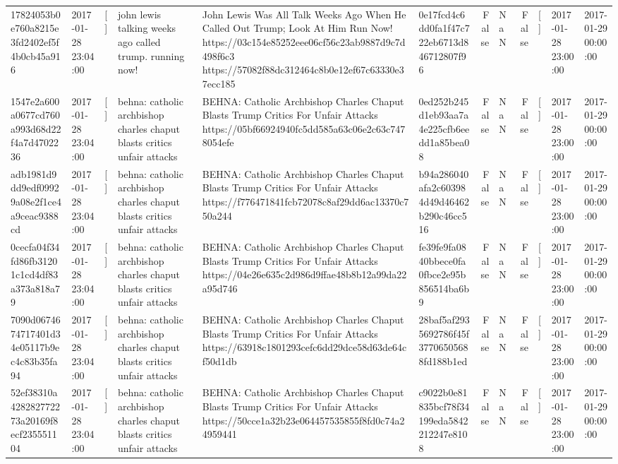 \begin{tabular}{llllllrlrlll}
17824053b0e760a8215e3fd2402ef5f4b0cb45a916 & 2017-01-28 23:04:00 & [] & john lewis talking weeks ago called trump. running now! & John Lewis Was All Talk Weeks Ago When He Called Out Trump; Look At Him Run Now! https://03c154e85252eee06cf56c23ab9887d9c7d498f6c3 https://57082f88dc312464c8b0e12ef67c63330e37ecc185 & 0e17fcd4c6dd0fa1f47c722eb6713d846712807f96 & False & NaN & False & [] & 2017-01-28 23:00:00 & 2017-01-29 00:00:00 \\
1547e2a600a0677cd760a993d68d22f4a7d4702236 & 2017-01-28 23:04:00 & [] & behna: catholic archbishop charles chaput blasts critics unfair attacks & BEHNA: Catholic Archbishop Charles Chaput Blasts Trump Critics For Unfair Attacks https://05bf66924940fc5dd585a63c06e2c63c7478054efe & 0ed252b245d1eb93aa7a4e225cfb6eedd1a85bea08 & False & NaN & False & [] & 2017-01-28 23:00:00 & 2017-01-29 00:00:00 \\
adb1981d9dd9edf09929a08e2f1ce4a9ceac9388cd & 2017-01-28 23:04:00 & [] & behna: catholic archbishop charles chaput blasts critics unfair attacks & BEHNA: Catholic Archbishop Charles Chaput Blasts Trump Critics For Unfair Attacks https://f776471841fcb72078c8af29dd6ac13370c750a244 & b94a286040afa2c603984d49d46462b290c46cc516 & False & NaN & False & [] & 2017-01-28 23:00:00 & 2017-01-29 00:00:00 \\
0cecfa04f34fd86fb31201c1cd4df83a373a818a79 & 2017-01-28 23:04:00 & [] & behna: catholic archbishop charles chaput blasts critics unfair attacks & BEHNA: Catholic Archbishop Charles Chaput Blasts Trump Critics For Unfair Attacks https://04e26e635c2d986d9ffae48b8b12a99da22a95d746 & fe39fe9fa0840bbece0fa0fbce2e95b856514ba6b9 & False & NaN & False & [] & 2017-01-28 23:00:00 & 2017-01-29 00:00:00 \\
7090d0674674717401d34e05117b9ec4c83b35fa94 & 2017-01-28 23:04:00 & [] & behna: catholic archbishop charles chaput blasts critics unfair attacks & BEHNA: Catholic Archbishop Charles Chaput Blasts Trump Critics For Unfair Attacks https://63918c1801293cefc6dd29dce58d63de64cf50d1db & 28baf5af2935692786f45f37706505688fd188b1ed & False & NaN & False & [] & 2017-01-28 23:00:00 & 2017-01-29 00:00:00 \\
52ef38310a428282772273a20169f8ecf235551104 & 2017-01-28 23:04:00 & [] & behna: catholic archbishop charles chaput blasts critics unfair attacks & BEHNA: Catholic Archbishop Charles Chaput Blasts Trump Critics For Unfair Attacks https://50cce1a32b23e064457535855f8fd0c74a24959441 & c9022b0e81835bcf78f34199eda5842212247e8108 & False & NaN & False & [] & 2017-01-28 23:00:00 & 2017-01-29 00:00:00 \\

\end{tabular}
